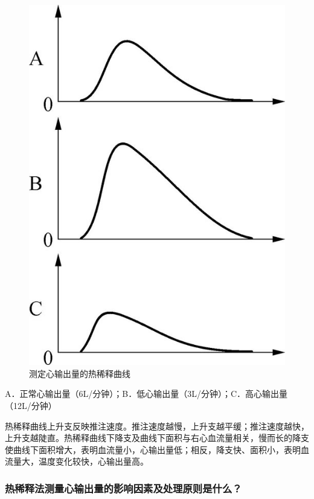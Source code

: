 \begin{figure}[!htbp]
 \centering
 \includegraphics{./images/Image00042.jpg}
 \captionsetup{justification=centering}
 \caption{测定心输出量的热稀释曲线}
 \label{fig4-10}
  \end{figure} 

A．正常心输出量（6L/分钟）；B．低心输出量（3L/分钟）；C．高心输出量（12L/分钟）

热稀释曲线上升支反映推注速度。推注速度越慢，上升支越平缓；推注速度越快，上升支越陡直。热稀释曲线下降支及曲线下面积与右心血流量相关，慢而长的降支使曲线下面积增大，表明血流量小，心输出量低；相反，降支快、面积小，表明血流量大，温度变化较快，心输出量高。

\subsubsection{热稀释法测量心输出量的影响因素及处理原则是什么？}

